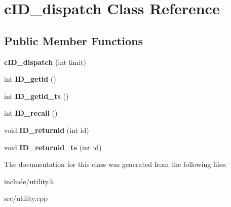 \hypertarget{classcID__dispatch}{\section{c\-I\-D\-\_\-dispatch \-Class \-Reference}
\label{d6/d70/classcID__dispatch}
}
\subsection*{\-Public \-Member \-Functions}
\begin{DoxyCompactItemize}
\item 
\hypertarget{classcID__dispatch_affdaa11979bcf753e94f5461d43821c3}{{\bfseries c\-I\-D\-\_\-dispatch} (int limit)}\label{d6/d70/classcID__dispatch_affdaa11979bcf753e94f5461d43821c3}

\item 
\hypertarget{classcID__dispatch_a0c2006cbdee6c1fa049d4d56ca1cf162}{int {\bfseries \-I\-D\-\_\-getid} ()}\label{d6/d70/classcID__dispatch_a0c2006cbdee6c1fa049d4d56ca1cf162}

\item 
\hypertarget{classcID__dispatch_a6c6907c20eadbfa7a20e9e6d6d770524}{int {\bfseries \-I\-D\-\_\-getid\-\_\-ts} ()}\label{d6/d70/classcID__dispatch_a6c6907c20eadbfa7a20e9e6d6d770524}

\item 
\hypertarget{classcID__dispatch_aa70e7c3637506ce6fa031ffb55b33665}{int {\bfseries \-I\-D\-\_\-recall} ()}\label{d6/d70/classcID__dispatch_aa70e7c3637506ce6fa031ffb55b33665}

\item 
\hypertarget{classcID__dispatch_accbab0ee78ff00a74fdff3317b24dd90}{void {\bfseries \-I\-D\-\_\-returnid} (int id)}\label{d6/d70/classcID__dispatch_accbab0ee78ff00a74fdff3317b24dd90}

\item 
\hypertarget{classcID__dispatch_a4c9874c076f685bf5a497d0741a190c6}{void {\bfseries \-I\-D\-\_\-returnid\-\_\-ts} (int id)}\label{d6/d70/classcID__dispatch_a4c9874c076f685bf5a497d0741a190c6}

\end{DoxyCompactItemize}


\-The documentation for this class was generated from the following files\-:\begin{DoxyCompactItemize}
\item 
include/utility.\-h\item 
src/utility.\-cpp\end{DoxyCompactItemize}

